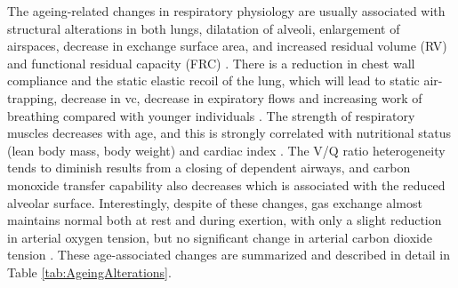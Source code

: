 The ageing-related changes in respiratory physiology are usually associated with structural alterations in both lungs, dilatation of alveoli, enlargement of airspaces, decrease in exchange surface area, and increased residual volume (RV) and functional residual capacity (FRC) \citep{sprung2006age,lalley2013aging}. There is a reduction in chest wall compliance and the static elastic recoil of the lung, which will lead to static air-trapping, decrease in \gls{vc}, decrease in expiratory flows and increasing work of breathing compared with younger individuals \citep{sprung2006age}. The strength of respiratory muscles decreases with age, and this is strongly correlated with nutritional status (lean body mass, body weight) and cardiac index \citep{janssens1999physiological}. The V/Q ratio heterogeneity tends to diminish results from a closing of dependent airways, and carbon monoxide transfer capability also decreases which is associated with the reduced alveolar surface. Interestingly, despite of these changes, gas exchange almost maintains normal both at rest and during exertion, with only a slight reduction in arterial oxygen tension, but no significant change in arterial carbon dioxide tension \citep{janssens1999physiological}. These age-associated changes are summarized and described in detail in Table \ref{tab:AgeingAlterations}.

